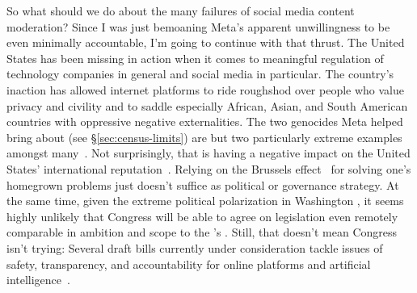 So what should we do about the many failures of social media content moderation?
Since I was just bemoaning Meta's apparent unwillingness to be even minimally
accountable, I'm going to continue with that thrust. The United States has been
missing in action when it comes to meaningful regulation of technology companies
in general and social media in particular. The country's inaction has allowed
internet platforms to ride roughshod over people who value privacy and civility
and to saddle especially African, Asian, and South American countries with
oppressive negative externalities. The two genocides Meta helped bring about
(see \S\ref{sec:census-limits}) are but two particularly extreme examples
amongst
many~\cite{DwoskinNewmyerea2021,ElliottChristopherea2021a,FrenkelAlba2021,Iyengar2021,MacSilverman2020,Morris2021,Newton2021,Satariano2021,Scott2021,SilvermanMacea2020,Simonite2021,WongEllisPetersen2021,WongErnst2021,WongHarding2021,ZahrzewskiDeVynckea2021}.
Not surprisingly, that is having a negative impact on the United States'
international reputation~\cite{GeltzerGhosh2018}. Relying on the Brussels
effect~\cite{Bradford2020} for solving one's homegrown problems just doesn't
suffice as political or governance strategy. At the same time, given the extreme
political polarization in Washington , it seems highly unlikely that
Congress will be able to agree on legislation even remotely comparable in
ambition and scope to the 's . Still, that doesn't mean Congress
isn't trying: Several draft bills currently under consideration tackle issues of
safety, transparency, and accountability for online platforms and artificial
intelligence~\cite{Lenhart2023}.

